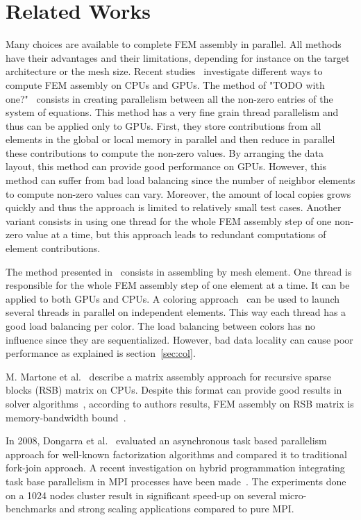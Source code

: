 \documentclass{IOS-Book-Article}
\begin{document}
\section{Related Works}
Many choices are available to complete FEM assembly in parallel.
All methods have their advantages and their limitations, depending for instance on the target architecture or the mesh size.
Recent studies~\cite{cecka2011assembly,CPUGPUasm} investigate different ways to compute FEM assembly on CPUs and GPUs.
The method of "TODO with one?"~\cite{} consists in creating parallelism between all the non-zero entries of the system of equations.
This method has a very fine grain thread parallelism and thus can be applied only to GPUs.
First, they store contributions from all elements in the global or local memory in parallel and then reduce in parallel these contributions to compute the non-zero values.
By arranging the data layout, this method can provide good performance on GPUs.
However, this method can suffer from bad load balancing since the number of neighbor elements to compute non-zero values can vary.
Moreover, the amount of local copies grows quickly and thus the approach is limited to relatively small test cases.
Another variant consists in using one thread for the whole FEM assembly step of one non-zero value at a time, but this approach leads to redundant computations of element contributions.

The method presented in~\cite{} consists in assembling by mesh element. One thread is responsible for the whole FEM assembly step of one element at a time.
It can be applied to both GPUs and CPUs.
A coloring approach~\cite{CUDAfe,CPUfe} can be used to launch several threads in parallel on independent elements.
This way each thread has a good load balancing per color. The load balancing between colors has no influence since they are sequentialized.
However, bad data locality can cause poor performance as explained is section~\ref{sec:col}.

M. Martone et al.~\cite{RSBasm} describe a matrix assembly approach for recursive sparse blocks (RSB) matrix on CPUs.
Despite this format can provide good results in solver algorithms~\cite{RSBsolver}, according to authors results, FEM assembly on RSB matrix is memory-bandwidth bound~\cite{RSBasm}.

In 2008, Dongarra et al.~\cite{Dongarra} evaluated an asynchronous task based parallelism approach for well-known factorization algorithms and compared it to traditional fork-join approach.
A recent investigation on hybrid programmation integrating task base parallelism in MPI processes have been made~\cite{MPIhybid}.
The experiments done on a 1024 nodes cluster result in significant speed-up on several micro-benchmarks and strong scaling applications compared to pure MPI.
\end{document}
